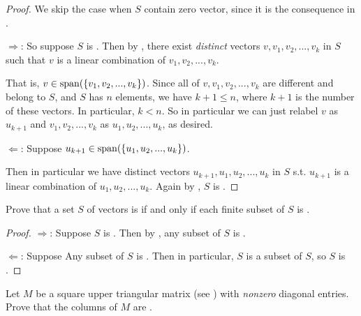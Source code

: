 \begin{proof}
We skip the case when \(S\) contain zero vector, since it is the consequence in .

\(\Longrightarrow\):
So suppose \(S\) is \LDP{}{}.
Then by , there exist \emph{distinct} vectors \(v, v_1, v_2, ..., v_k\) in \(S\) such that \(v\) is a linear combination of \(v_1, v_2, ..., v_k\).

That is, \(v \in \operatorname{span}(\{ v_1, v_2, ..., v_k \})\).
Since all of \(v, v_1, v_2, ..., v_k\) are different and belong to \(S\), and \(S\) has \(n\) elements, we have \(k + 1 \le n\), where \(k + 1\) is the number of these vectors.
In particular, \(k < n\).
So in particular we can just relabel \(v\) as \(u_{k + 1}\) and \(v_1, v_2, ..., v_k\) as \(u_1, u_2, ..., u_k\), as desired.

\(\Longleftarrow\):
Suppose \(u_{k + 1} \in \operatorname{span}(\{ u_1, u_2, ..., u_k \})\).

Then in particular we have distinct vectors \(u_{k + 1}, u_1, u_2, ..., u_k\) in \(S\) s.t. \(u_{k + 1}\) is a linear combination of \(u_1, u_2, ..., u_k\).
Again by , \(S\) is \LDP{}{}.
\end{proof}

\begin{exercise} \label{exercise 1.5.16}
Prove that a set \(S\) of vectors is \LID{} if and only if each finite subset of \(S\) is \LID{}.
\end{exercise}

\begin{proof}
\(\Longrightarrow\):
Suppose \(S\) is \LID{}.
Then by , any subset of \(S\) is \LID{}.

\(\Longleftarrow\):
Suppose Any subset of \(S\) is \LID{}.
Then in particular, \(S\) is a subset of \(S\), so \(S\) is \LID{}.
\end{proof}

\begin{exercise} \label{exercise 1.5.17}
Let \(M\) be a square upper triangular matrix (see ) with \emph{nonzero} diagonal entries.
Prove that the columns of \(M\) are \LID{}.
\end{exercise}

